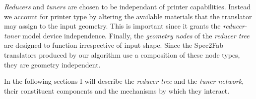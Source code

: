 	\emph{Reducers} and \emph{tuners} are chosen to be independant of printer capabilities. Instead we account for printer type by altering the available materials that the translator may assign to the input geometry.  This is important since it grants the \emph{reducer-tuner} model  device independence. Finally, the \emph{geometry nodes} of the \emph{reducer tree} are designed to function irrespective of input shape. Since the Spec2Fab translators produced by our algorithm use a composition of these node types, they are geometry independent. 
	
	In the following sections I will describe the \emph{reducer tree} and the \emph{tuner network}, their constituent components and the mechanisms by which they interact. 
